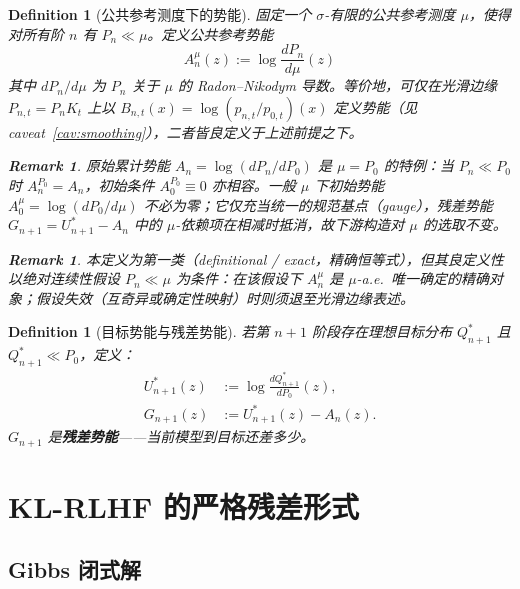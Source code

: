 \documentclass[11pt,a4paper]{article}
\newtheorem{definition}[theorem]{Definition}
\newtheorem{remark}[theorem]{Remark}
\begin{document}
\begin{definition}[公共参考测度下的势能]\label{def:mu_potential}
固定一个 $\sigma$-有限的公共参考测度 $\mu$，使得对所有阶 $n$ 有 $P_n\ll\mu$。定义\emph{公共参考势能}
\begin{equation*}
\boxed{\;A_n^\mu(z) := \log\frac{dP_n}{d\mu}(z)\;}
\end{equation*}
其中 $dP_n/d\mu$ 为 $P_n$ 关于 $\mu$ 的 Radon--Nikodym 导数。等价地，可仅在光滑边缘 $P_{n,t}=P_nK_t$ 上以 $B_{n,t}(x)=\log(p_{n,t}/p_{0,t})(x)$ 定义势能（见 caveat~\ref{cav:smoothing}），二者皆良定义于上述前提之下。

\begin{remark}
原始累计势能 $A_n=\log(dP_n/dP_0)$ 是 $\mu=P_0$ 的特例：当 $P_n\ll P_0$ 时 $A_n^{P_0}=A_n$，初始条件 $A_0^{P_0}\equiv 0$ 亦相容。一般 $\mu$ 下初始势能 $A_0^\mu=\log(dP_0/d\mu)$ 不必为零；它仅充当统一的规范基点（gauge），残差势能 $G_{n+1}=U_{n+1}^*-A_n$ 中的 $\mu$-依赖项在相减时抵消，故下游构造对 $\mu$ 的选取不变。
\end{remark}

\begin{remark}
本定义为\emph{第一类}（definitional / exact，精确恒等式），但其良定义性以绝对连续性假设 $P_n\ll\mu$ 为条件：在该假设下 $A_n^\mu$ 是 $\mu$-a.e.\ 唯一确定的精确对象；假设失效（互奇异或确定性映射）时则须退至光滑边缘表述。
\end{remark}
\end{definition}

\begin{definition}[目标势能与残差势能]
若第 $n{+}1$ 阶段存在理想目标分布 $Q_{n+1}^*$ 且 $Q_{n+1}^* \ll P_0$，定义：
\begin{align}
U_{n+1}^*(z) &:= \log\frac{dQ_{n+1}^*}{dP_0}(z), \label{eq:Ustar}\\[4pt]
G_{n+1}(z) &:= U_{n+1}^*(z) - A_n(z). \label{eq:residual}
\end{align}
$G_{n+1}$ 是\textbf{残差势能}——当前模型到目标还差多少。
\end{definition}

\section{KL-RLHF 的严格残差形式}
\label{sec:kl_rlhf}

\subsection{Gibbs 闭式解}
\end{document}
